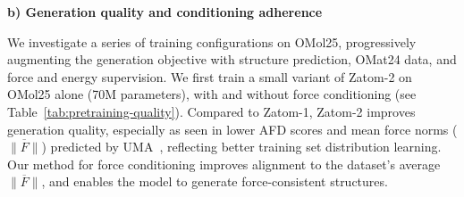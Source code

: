 \documentclass{article} %
\begin{document}
\begin{table}[htbp]
  \vspace{0.3em}

  {\textbf{b) Generation quality and conditioning adherence}\par}
  \vspace{0.25em}
\end{table}

We investigate a series of training configurations on OMol25, progressively augmenting the generation objective with structure prediction, OMat24 data, and force and energy supervision. We first train a small variant of Zatom-2 on OMol25 alone (70M parameters), with and without force conditioning (see Table~\ref{tab:pretraining-quality}). Compared to Zatom-1, Zatom-2 improves generation quality, especially as seen in lower AFD scores and mean force norms ($\overline{\|F\|}$) predicted by UMA~\citep{wood2025uma}, reflecting better training set distribution learning. Our method for force conditioning improves alignment to the dataset's average $\overline{\|F\|}$, and enables the model to generate force-consistent structures.
\end{document}
